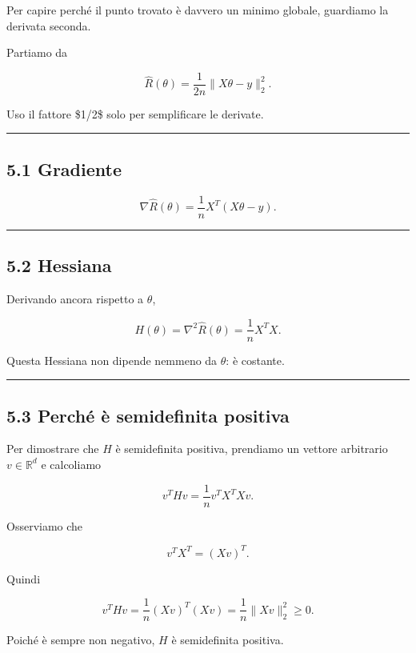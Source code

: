 \documentclass[
]{article}
\begin{document}
Per capire perché il punto trovato è davvero un minimo globale,
guardiamo la derivata seconda.

Partiamo da

\[
\hat R(\theta)=\frac{1}{2n}\|X\theta-y\|_2^2.
\]

Uso il fattore \$1/2\$ solo per semplificare le derivate.

\begin{center}\rule{0.5\linewidth}{0.5pt}\end{center}

\subsection{5.1 Gradiente}\label{gradiente}

\[
\nabla \hat R(\theta)=\frac{1}{n}X^T(X\theta-y).
\]

\begin{center}\rule{0.5\linewidth}{0.5pt}\end{center}

\subsection{5.2 Hessiana}\label{hessiana}

Derivando ancora rispetto a \(\theta\),

\[
H(\theta)=\nabla^2 \hat R(\theta)=\frac{1}{n}X^TX.
\]

Questa Hessiana non dipende nemmeno da \(\theta\): è costante.

\begin{center}\rule{0.5\linewidth}{0.5pt}\end{center}

\subsection{5.3 Perché è semidefinita
positiva}\label{perchuxe9-uxe8-semidefinita-positiva}

Per dimostrare che \(H\) è semidefinita positiva, prendiamo un vettore
arbitrario \(v\in\mathbb{R}^d\) e calcoliamo

\[
v^THv = \frac{1}{n}v^TX^TXv.
\]

Osserviamo che

\[
v^TX^T = (Xv)^T.
\]

Quindi

\[
v^THv = \frac{1}{n}(Xv)^T(Xv)=\frac{1}{n}\|Xv\|_2^2 \ge 0.
\]

Poiché è sempre non negativo, \(H\) è semidefinita positiva.
\end{document}
